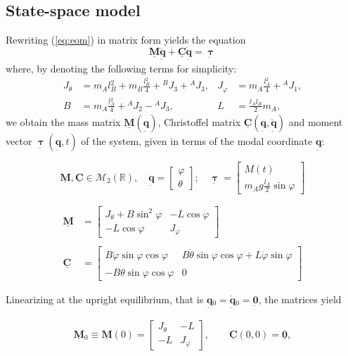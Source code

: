 \documentclass[12pt]{article}
\newcommand{\vb}[1]{{\underset{\tilde{}}{\mathbf{#1}}}}
\newcommand{\mb}[1]{\underline{\mathbf{#1}}}
\begin{document}
\subsection{State-space model}
\label{sec:state-space}

Rewriting (\ref{eq:eom}) in matrix form yields the equation 
$$ \mb{M} \ddot{\vb{q}} + \mb{C} \dot{\vb{q}} = \vb{\boldsymbol{\uptau}}$$
where, by denoting the following terms for simplicity: 
\begin{align*}
    J{}_\theta &= m{}_A l{}_B^2 + m{}_B \frac{l{}_B^2}{4} + {}^B J{}_3 + {}^A J{}_3 , & J{}_\varphi &= m{}_A \frac{l{}_A^2}{4} + {}^A J{}_1, \\
    B &= m{}_A \frac{l{}_A^2}{4} + {}^A J{}_2 - {}^A J{}_3, & L &= \frac{l{}_A l{}_B}{2} m{}_A,
\end{align*}
we obtain the mass matrix $\mb{M}(\vb{q})$, Christoffel matrix $\mb{C}(\vb{q}, \dot{\vb{q}})$ and moment vector $\vb{\boldsymbol{\uptau}}(\vb{q}, t)$ of the system, given in terms of the modal coordinate $\vb{q}$:

$$\mb{M}, \mb{C} \in \mathcal{M}{}_2(\mathbb{R}), \quad \vb{q} = \begin{bmatrix} \varphi \\ \theta \end{bmatrix} ; \quad \vb{\boldsymbol{\uptau}} = \begin{bmatrix} M(t) \\  m{}_A g \frac{l{}_A}{2} \sin\varphi \end{bmatrix} $$

\begin{align*}
    \mb{M} &= \begin{bmatrix} J{}_\theta + B\sin^2\varphi & -L\cos\varphi \\ -L\cos\varphi & J{}_\varphi \end{bmatrix} \\
    \\
    \mb{C} &= \begin{bmatrix} B \dot{\varphi} \sin\varphi\cos\varphi & B \dot{\theta} \sin\varphi\cos\varphi + L \dot{\varphi} \sin\varphi \\ -B \dot{\theta} \sin\varphi\cos\varphi & 0 \end{bmatrix}
\end{align*}


Linearizing at the upright equilibrium, that is \(\vb{q}{}_0 = \dot{\vb{q}}{}_0=\vb{0}\), the matrices yield

\[
\mb{M}{}_0 \equiv \mb{M}(0)=
\begin{bmatrix}
J_\theta & -L\\
-L & J_\varphi
\end{bmatrix},
\qquad
\mb{C}(0,0)=\mb{0},
\]
\end{document}
